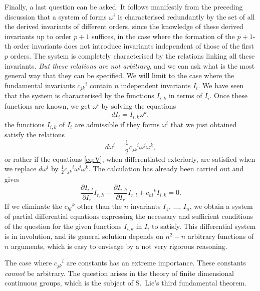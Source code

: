 \documentclass[leqno,11pt]{article}
\newcommand{\pd}{\partial}
\theoremstyle{shape1}
\theoremstyle{shape0}
\theoremstyle{shape2}
\theoremstyle{definition}
\begin{document}
Finally, a last question can be asked. It follows manifestly from the preceding discussion that a system of forms $\omega^{i}$ is characterised redundantly by the set of all the derived invariants of different orders, since the knowledge of these derived invariants up to order $p+1$ suffices, in the case where the formation of the $p+1$-th order invariants does not introduce invariants independent of those of the first $p$ orders. The system is completely characterised by the relations linking all these invariants. \emph{But these relations are not arbitrary}, and we can ask what is the most general way that they can be specified. We will limit to the case where the fundamental invariants $c_{jk}{}^{i}$ contain $n$ independent invariants $I_{i}$. We have seen that the system is characterised by the functions $I_{i,k}$ in terms of $I_{i}$. Once these functions are known, we get $\omega^{i}$ by solving the equations
\begin{equation}
  \label{eq:V}\tag{V}
  dI_{i}=I_{i,k}\omega^{k},
\end{equation}
the functions $I_{i,k}$ of $I_{i}$ are admissible if they forms $\omega^{i}$ that we just obtained satisfy the relations
\[
d\omega^{i}=\frac{1}{2}c_{jk}{}^{i}\omega^{j}\omega^{k},
\]
or rather if the equations \eqref{eq:V}, when differentiated exteriorly, are satisfied when we replace $d\omega^{i}$ by $\frac{1}{2}c_{jk}{}^{i}\omega^{j}\omega^{k}$. The calculation has already been carried out and gives
\[
\frac{\pd I_{i,l}}{\pd I_{r}}I_{r,h}-\frac{\pd I_{i,h}}{\pd I_{r}}I_{r,l}+c_{hl}{}^{k}I_{i,k}=0.
\]
If we eliminate the $c_{hl}{}^{k}$ other than the $n$ invariants $I_{1}$, $\dots$, $I_{n}$, we obtain a system of partial differential equations expressing the necessary and sufficient conditions of the question for the given functions $I_{i,k}$ in $I_{i}$ to satisfy. This differential system is in involution, and its general solution depends on $n^{2}-n$ arbitrary functions of $n$ arguments, which is easy to envisage by a not very rigorous reasoning.

The case where $c_{jk}{}^{i}$ are constants has an extreme importance. These constants \emph{cannot} be arbitrary. The question arises in the theory of finite dimensional continuous groups, which is the subject of S.~Lie's third fundamental theorem.
\end{document}
